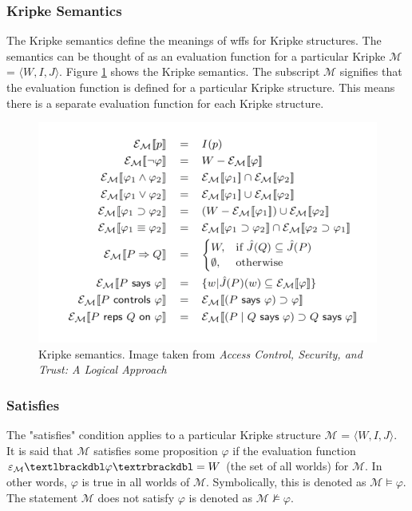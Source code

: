 \documentclass[../../main/main.tex]{subfiles}
\begin{document}
\subsubsection{Kripke Semantics}\label{ssec:kripkesemantics}
The Kripke semantics define the meanings of \gls{wff}s for Kripke structures.  The semantics can be thought of as an evaluation function for a particular Kripke $\mathcal{M}$ = $\langle \textit{W}, \textit{I}, \textit{J} \rangle $.  Figure \ref{kripkesemantics} shows the Kripke semantics.  The subscript $\mathcal{M}$ signifies that the evaluation function is defined for a particular Kripke structure.  This means there is a separate evaluation function for each Kripke structure.


\begin{figure}[h]
\centering
\includegraphics{../figures/kripkesemantics}
\caption{\label{kripkesemantics} Kripke semantics. Image taken from \textit{Access Control, Security, and Trust: A Logical Approach}\cite{ChinOlder}}
\end{figure}

%
\subsubsection{Satisfies}\label{sssec:satisfies}
The "satisfies" condition applies to a particular Kripke structure $\mathcal{M}$ = $\langle \textit{W}, \textit{I}, \textit{J} \rangle $.  It is said that $\mathcal{M}$ satisfies some proposition $\varphi$ if the evaluation function $\varepsilon_{\mathcal{M}}\textlbrackdbl \varphi \textrbrackdbl = W$ (the set of all worlds) for  $\mathcal{M}$.  In other words, $\varphi$ is true in all worlds of $\mathcal{M}$.  Symbolically, this is denoted as $\mathcal{M} \models \varphi$.  The statement $\mathcal{M}$ does not satisfy $\varphi$ is denoted as $\mathcal{M} \not\models \varphi$.
\end{document}
